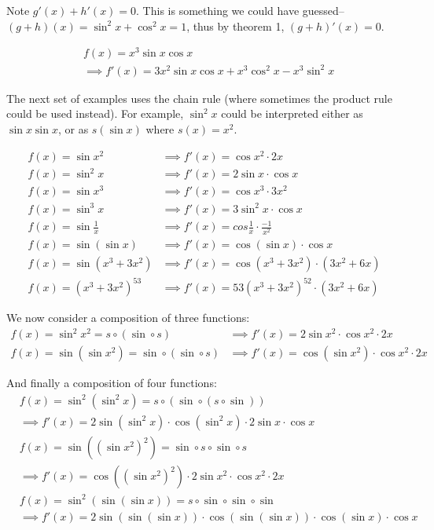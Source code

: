 Note $g'(x)+h'(x)=0$. This is something we could have guessed--
$(g+h)(x)=\sin^2x+\cos^2x=1$, thus by theorem 1, $(g+h)'(x)=0$.

\vs

\begin{align*}
  &f(x)=x^3\sin x\cos x\\
  &\implies f'(x)=3x^2\sin x\cos x+x^3\cos^2x-x^3\sin^2x
\end{align*}

The next set of examples uses the chain rule (where sometimes the
product rule could be used instead). For example, $\sin^2 x$ could be
interpreted either as $\sin x\sin x$, or as $s(\sin x)$ where
$s(x)=x^2$.

\begin{align*}
  f(x)=\sin x^2&\implies f'(x)=\cos x^2\cdot 2x\\
  f(x)=\sin^2x&\implies f'(x)=2\sin x\cdot \cos x\\
  f(x)=\sin x^3&\implies f'(x)=\cos x^3\cdot 3x^2\\
  f(x)=\sin^3x&\implies f'(x)=3\sin^2x\cdot\cos x\\
  f(x)=\sin \frac{1}{x}&\implies f'(x)=cos \frac{1}{x}\cdot
                         \frac{-1}{x^2}\\
  f(x)=\sin(\sin x)&\implies f'(x)=\cos(\sin x)\cdot \cos x\\
  f(x)=\sin(x^3+3x^2)&\implies f'(x)=\cos(x^3+3x^2)\cdot(3x^2+6x)\\
  f(x)=(x^3+3x^2)^{53}&\implies f'(x)=53(x^3+3x^2)^{52}\cdot(3x^2+6x)
\end{align*}

We now consider a composition of three functions:
\begin{align*}
  f(x)=\sin^2x^2=s\circ(\sin\circ s)&\implies f'(x)=2\sin x^2\cdot \cos x^2\cdot 2x\\
  f(x)=\sin(\sin x^2)=\sin\circ(\sin\circ s)&\implies f'(x)=\cos(\sin x^2)\cdot
                                      \cos x^2\cdot 2x
\end{align*}

And finally a composition of four functions:
\begin{align*}
  &f(x)=\sin^2(\sin^2x)=s\circ(\sin\circ (s\circ \sin))\\
  &\implies f'(x)=2\sin(\sin^2x)\cdot\cos(\sin^2x)\cdot2\sin x\cdot\cos x\\
  &f(x)=\sin((\sin x^2)^2)=\sin\circ s\circ\sin\circ s\\
  &\implies f'(x)=\cos((\sin x^2)^2)\cdot2\sin x^2\cdot \cos x^2\cdot 2x\\
  &f(x)=\sin^2(\sin(\sin x))=s\circ\sin\circ\sin\circ\sin\\
  &\implies f'(x)=2\sin(\sin(\sin x))\cdot \cos(\sin(\sin x))\cdot \cos(\sin
    x)\cdot \cos x
\end{align*}

